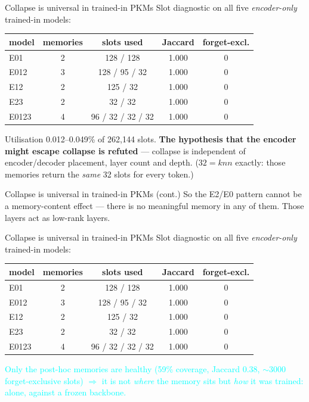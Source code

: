 \documentclass{beamer}
\newcommand{\pierre}[1]{\textcolor{cyan}{#1}}
\begin{document}
\begin{frame}{Collapse is universal in trained-in PKMs}
Slot diagnostic on all five \emph{encoder-only} trained-in models:
\begin{center}
\begin{tabular}{|l|c|c|c|c|}
\hline
model & memories & slots used & Jaccard & forget-excl. \\
\hline
E01   & 2 & 128 / 128         & 1.000 & 0 \\
E012  & 3 & 128 / 95 / 32     & 1.000 & 0 \\
E12   & 2 & 125 / 32          & 1.000 & 0 \\
E23   & 2 & 32 / 32           & 1.000 & 0 \\
E0123 & 4 & 96 / 32 / 32 / 32 & 1.000 & 0 \\
\hline
\end{tabular}
\end{center}

Utilisation 0.012--0.049\% of 262{,}144 slots. \textbf{The hypothesis that the
encoder might escape collapse is refuted} --- collapse is independent of
encoder/decoder placement, layer count and depth. ($32 = knn$ exactly: those
memories return the \emph{same} 32 slots for every token.)

\end{frame}

\begin{frame}{Collapse is universal in trained-in PKMs (cont.)}
\alert{So the E2/E0 pattern cannot be a memory-content effect} --- there is no
meaningful memory in any of them. Those layers act as low-rank layers.


\end{frame}

\begin{frame}{Collapse is universal in trained-in PKMs}
\small
Slot diagnostic on all five \emph{encoder-only} trained-in models:
\begin{center}
\begin{tabular}{|l|c|c|c|c|}
\hline
model & memories & slots used & Jaccard & forget-excl. \\
\hline
E01   & 2 & 128 / 128         & 1.000 & 0 \\
E012  & 3 & 128 / 95 / 32     & 1.000 & 0 \\
E12   & 2 & 125 / 32          & 1.000 & 0 \\
E23   & 2 & 32 / 32           & 1.000 & 0 \\
E0123 & 4 & 96 / 32 / 32 / 32 & 1.000 & 0 \\
\hline
\end{tabular}
\end{center}

\medskip
\pierre{Only the post-hoc memories are healthy (59\% coverage, Jaccard 0.38,
$\sim$3000 forget-exclusive slots) $\Rightarrow$ it is not \emph{where} the memory
sits but \emph{how} it was trained: alone, against a frozen backbone.}
\end{frame}
\end{document}
